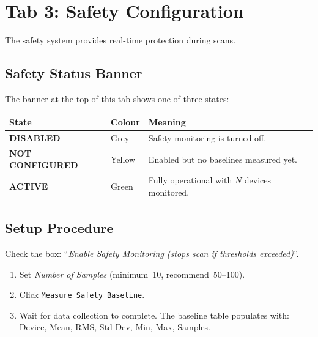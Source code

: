 \documentclass[11pt,a4paper,twoside]{report}
\newcommand{\btn}[1]{\colorbox{accent!12}{\texttt{\small #1}}}
\newcommand{\field}[1]{\textit{#1}}
\begin{document}
\section{Tab 3: Safety Configuration}\label{sec:tab3}

The safety system provides real-time protection during scans.

\subsection{Safety Status Banner}

The banner at the top of this tab shows one of three states:

\begin{tabularx}{\textwidth}{llX}
  \toprule
  \textbf{State} & \textbf{Colour} & \textbf{Meaning} \\
  \midrule
  \textbf{DISABLED}       & \textcolor{mutedtext}{Grey}    & Safety monitoring is turned off. \\
  \textbf{NOT CONFIGURED} & \textcolor{warncol}{Yellow}    & Enabled but no baselines measured yet. \\
  \textbf{ACTIVE}         & \textcolor{accent2}{Green}     & Fully operational with $N$ devices monitored. \\
  \bottomrule
\end{tabularx}

\subsection{Setup Procedure}

\begin{stepbox}
Check the box: ``\textit{Enable Safety Monitoring (stops scan if thresholds exceeded)}''.
\end{stepbox}

\begin{stepbox}
\begin{enumerate}
  \item Set \field{Number of Samples} (minimum~10, recommend~50--100).
  \item Click \btn{Measure Safety Baseline}.
  \item Wait for data collection to complete. The baseline table populates with: Device, Mean, RMS, Std Dev, Min, Max, Samples.
\end{enumerate}
\end{stepbox}
\end{document}

